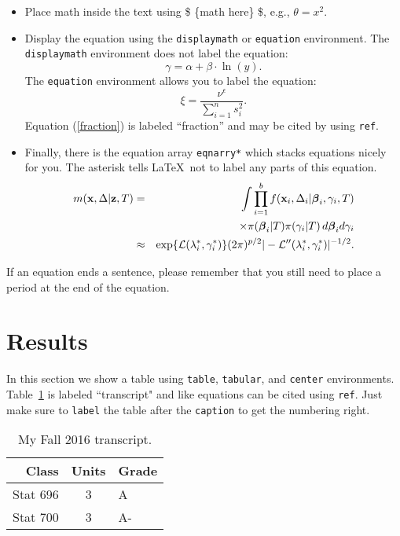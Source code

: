 \documentclass[11pt]{article}
\newcommand{\bfbeta}{\mbox{\boldmath $\beta$}}
\begin{document}
\begin{itemize} 

\item Place math inside the text using \$ \{math here\} \$, e.g., $\theta = x^2$.  

\item Display the equation using the {\tt displaymath} or {\tt equation} environment.  The {\tt displaymath} environment does not label the equation:
\[ \gamma = \alpha + \beta \cdot \ln(y).\]
The {\tt equation} environment allows you to label the equation:
\begin{equation}
\label{fraction}
\xi = \frac{\nu^{\epsilon}}{\sum_{i=1}^n s^2_i}.
\end{equation}
Equation (\ref{fraction}) is labeled ``fraction'' and may be cited by using {\tt ref}.

\item Finally, there is the equation array {\tt eqnarry*} which stacks equations nicely for you.  The asterisk tells \LaTeX\ not to label any parts of this equation.
\begin{eqnarray*}
m({\bf x}, \Delta | {\bf z}, T) 
	& = & \int \prod_{i=1}^b  
	 f({\bf x}_i, \Delta_i | \bfbeta_i, \gamma_i, T) \\
	& & \hspace{1cm} \times \pi(\bfbeta_i|T) 
	\pi(\gamma_i|T) \, d\bfbeta_i d\gamma_i \\
	& \approx & \exp\{{\cal L}(\lambda^*_i, \gamma^*_i)\} (2\pi)^{p/2}|-
	 {\cal L}''(\lambda^*_i, \gamma^*_i)|^{-1/2}.
\end{eqnarray*}
\end{itemize}
If an equation ends a sentence, please remember that you still need to place a period at the end of the equation.

\section{Results}
\label{results}

In this section we show a table using {\tt table}, {\tt tabular}, and {\tt center} environments.  Table~\ref{transcript} is labeled ``transcript" and like equations can be cited using {\tt ref}.  Just make sure to {\tt label} the table after the {\tt caption} to get the numbering right.

\begin{table}
\caption{My Fall 2016 transcript.}
\label{transcript}
\begin{center}
\begin{tabular}{|r|c|l|} \hline
Class & Units & Grade \\ \hline
Stat 696 & 3 & A \\ \hline
Stat 700 & 3 & A- \\ \hline
\end{tabular}
\end{center}
\end{table}
\end{document}
